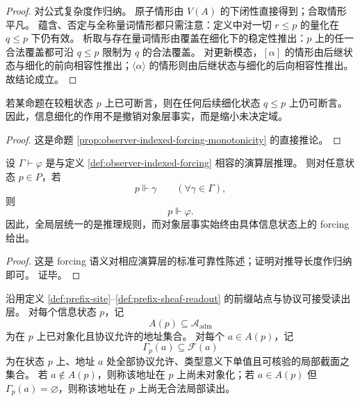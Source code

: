 \begin{proof}
对公式复杂度作归纳。
原子情形由 \(V(A)\) 的下闭性直接得到；合取情形平凡。
蕴含、否定与全称量词情形都只需注意：定义中对一切 \(r\le p\) 的量化在 \(q\le p\) 下仍有效。
析取与存在量词情形由覆盖在细化下的稳定性推出：\(p\) 上的任一合法覆盖都可沿 \(q\le p\) 限制为 \(q\) 的合法覆盖。
对更新模态，\([\alpha]\) 的情形由后继状态与细化的前向相容性推出；\(\langle\alpha\rangle\) 的情形则由后继状态与细化的后向相容性推出。
故结论成立。
\end{proof}

\begin{corollary}[细化不推翻已建立的对象事实]\label{cor:observer-indexed-no-retraction}
若某命题在较粗状态 \(p\) 上已可断言，则在任何后续细化状态 \(q\le p\) 上仍可断言。
因此，信息细化的作用不是撤销对象层事实，而是缩小未决定域。
\end{corollary}

\begin{proof}
这是命题 \ref{prop:observer-indexed-forcing-monotonicity} 的直接推论。
\end{proof}

\begin{proposition}[全局层只统一推理规则]\label{prop:observer-indexed-global-layer-logic-only}
设 \(\Gamma\vdash \varphi\) 是与定义 \ref{def:observer-indexed-forcing} 相容的演算层推理。
则对任意状态 \(p\in P\)，若
\[
p\Vdash \gamma
\qquad (\forall \gamma\in \Gamma),
\]
则
\[
p\Vdash \varphi.
\]
因此，全局层统一的是推理规则，而对象层事实始终由具体信息状态上的 forcing 给出。
\end{proposition}

\begin{proof}
这是 forcing 语义对相应演算层的标准可靠性陈述；证明对推导长度作归纳即可。
证毕。
\end{proof}

\begin{definition}[地址对象与局部截面]\label{def:observer-indexed-address-local-sections}
沿用定义 \ref{def:prefix-site}--\ref{def:prefix-sheaf-readout} 的前缀站点与协议可接受读出层。
对每个信息状态 \(p\)，记
\[
A(p)\subseteq \mathcal{A}_{\mathrm{adm}}
\]
为在 \(p\) 上已对象化且协议允许的地址集合。
对每个 \(a\in A(p)\)，记
\[
\Gamma_p(a)\subseteq \mathscr{F}(a)
\]
为在状态 \(p\) 上、地址 \(a\) 处全部协议允许、类型意义下单值且可核验的局部截面之集合。
若 \(a\notin A(p)\)，则称该地址在 \(p\) 上尚未对象化；若 \(a\in A(p)\) 但 \(\Gamma_p(a)=\varnothing\)，则称该地址在 \(p\) 上尚无合法局部读出。
\end{definition}


